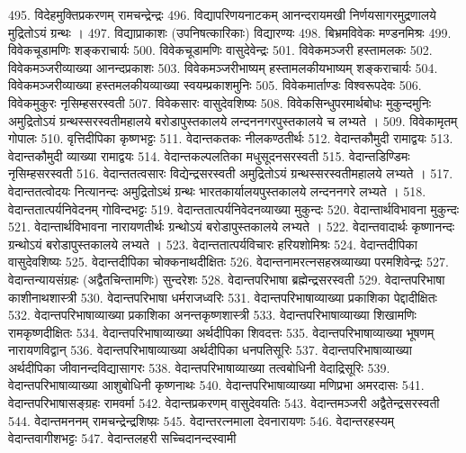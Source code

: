 495. विदेहमुक्तिप्रकरणम् 				रामचन्द्रेन्द्रः
496. विद्यापरिणयनाटकम् 				आनन्दरायमखी
		निर्णयसागरमुद्रणालये मुद्रितोऽयं ग्रन्थः ।
497. विद्याप्राकाशः (उपनिषत्कारिकाः) विद्यारण्यः
498. बिभ्रमविवेकः						मण्डनमिश्रः
499. विवेकचूडामणिः					शङ्कराचार्यः
500. विवेकचूडामणिः					वासुदेवेन्द्रः
501. विवेकमञ्जरी						हस्तामलकः
502. विवेकमञ्जरीव्याख्या				आनन्दप्रकाशः
503. विवेकमञ्जरीभाष्यम् हस्तामलकीयभाष्यम् 	शङ्कराचार्यः
504. विवेकमञ्जरीव्याख्या हस्तमलकीयव्याख्या	स्वयम्प्रकाशमुनिः
505. विवेकमार्ताण्डः					विश्वरूपदेवः
506. विवेकमुकुरः						नृसिम्हसरस्वती 
507. विवेकसारः						वासुदेवशिष्यः
508. विवेकसिन्धुपरमार्थबोधः			मुकुन्दमुनिः
		अमुद्रितोऽयं ग्रन्थस्सरस्वतीमहालये बरोडापुस्तकालये लन्दननगरपुस्तकालये च लभ्यते । 
509. विवेकामृतम् 						गोपालः
510. वृत्तिदीपिका 						कृष्णभट्टः
511. वेदान्तकतकः						नीलकण्ठतीर्थः
512. वेदान्तकौमुदी						रामाद्वयः
513. वेदान्तकौमुदी व्याख्या				रामाद्वयः
514. वेदान्तकल्पलतिका				मधुसूदनसरस्वती
515. वेदान्तडिण्डिमः 					नृसिम्हसरस्वती
516. वेदान्ततत्वसारः					विद्येन्द्रसरस्वती
		अमुद्रितोऽयं ग्रन्थस्सरस्वतीमहालये लभ्यते ।
517. वेदान्ततत्वोदयः					नित्यानन्दः
		अमुद्रितोऽथं ग्रन्थः भारतकार्यालयपुस्तकालये लन्दननगरे लभ्यते ।
518. वेदान्ततात्पर्यनिवेदनम्				गोविन्दभट्टः
519. वेदान्ततात्पर्यनिवेदनव्याख्या		मुकुन्दः
520. वेदान्तार्थविभावना					मुकुन्दः
521. वेदान्तार्थविभावना					नारायणतीर्थः
		ग्रन्थोऽयं बरोडापुस्तकालये लभ्यते । 
522. वेदान्तवादार्थः						कृष्णानन्दः
		ग्रन्थोऽयं बरोडापुस्तकालये लभ्यते । 
523. वेदान्ततात्पर्यविचारः				हरियशोमिश्रः
524. वेदान्तदीपिका						वासुदेवशिष्यः
525. वेदान्तदीपिका 					चोक्कनाथदीक्षितः 
526. वेदान्तनामरत्नसहस्रव्याख्या 		परमशिवेन्द्रः
527. वेदान्तन्यायसंग्रहः (अद्वैतचिन्तामणिः) सुन्दरेशः
528. वेदान्तपरिभाषा					ब्रह्मेन्द्रसरस्वती
529. वेदान्तपरिभाषा					काशीनाथशास्त्री
530. वेदान्तपरिभाषा					धर्मराजध्वरिः 
531. वेदान्तपरिभाषाव्याख्या प्रकाशिका पेद्दादीक्षितः
532. वेदान्तपरिभाषाव्याख्या प्रकाशिका अनन्तकृष्णशास्त्री
533. वेदान्तपरिभाषाव्याख्या शिखामणिः रामकृष्णदीक्षितः
534. वेदान्तपरिभाषाव्याख्या अर्थदीपिका  शिवदत्तः
535. वेदान्तपरिभाषाव्याख्या भूषणम् 	नारायणविद्वान् 
536. वेदान्तपरिभाषाव्याख्या अर्थदीपिका धनपतिसूरिः
537. वेदान्तपरिभाषाव्याख्या अर्थदीपिका जीवानन्दविद्यासागरः
538. वेदान्तपरिभाषाव्याख्या तत्वबोधिनी  वेदाद्रिसूरिः
539. वेदान्तपरिभाषाव्याख्या आशुबोधिनी  कृष्णनाथः
540. वेदान्तपरिभाषाव्याख्या मणिप्रभा 	अमरदासः 
541. वेदान्तपरिभाषासङ्ग्रहः				रामवर्मा
542. वेदान्तप्रकरणम् 						वासुदेवयतिः
543. वेदान्तमञ्जरी							अद्वैतेन्द्रसरस्वती
544. वेदान्तमननम् 							रामचन्द्रेन्द्रशिष्य़ः
545. वेदान्तरत्नमाला						देवनारायणः
546. वेदान्तरहस्यम् 						वेदान्तवागीशभट्टः
547. वेदान्तलहरी							सच्चिदानन्दस्वामी
